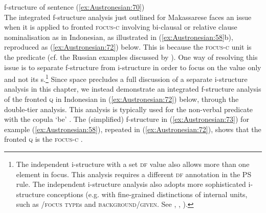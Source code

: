 \documentclass[output=paper,chinesefont]{../langscibook}
\begin{document}
\newpage
\ea\label{ex:Austronesian:71} f-structure of sentence (\ref{ex:Austronesian:70})\\
\z
The integrated f-structure analysis just outlined for Makassarese faces an issue when it is applied to fronted \textsc{focus-c} involving bi-clausal or relative clause nominalisation as in Indonesian, as illustrated in (\ref{ex:Austronesian:58}b), reproduced as (\ref{ex:Austronesian:72}) below. This is because the \textsc{focus-c} unit is the predicate (cf. the Russian examples discussed by \citealt{King1997}). One way of resolving this issue is to separate f-structure from i-structure in order to focus on the \PRED value only and not its {\GF}s.\footnote{The independent i-structure with a set \textsc{df} value also allows more than one element in focus. This analysis requires a different \textsc{df} annotation in the PS rule. The independent i-structure analysis also adopts more sophisticated i-structure conceptions (e.g. with fine-grained distinctions of internal units, such as \TOPIC/\textsc{focus} \textsc{type}s and \textsc{background/given}. See \citealt{King1997}, \citealt{DN}, \citealt{Butt14}).} Since space precludes a full discussion of a separate i-structure analysis in this chapter, we instead demonstrate an integrated f-structure analysis of the fronted \textsc{q} in Indonesian in (\ref{ex:Austronesian:72}) below, through the double-tier \PREDLINK analysis. This analysis is typically used for the non-verbal predicate with the copula `be' \citep{ButtEtAl1999,dalrympleetal04copular}. The (simplified) f-structure in (\ref{ex:Austronesian:73}) for example (\ref{ex:Austronesian:58}), repeated in (\ref{ex:Austronesian:72}), shows that the fronted \textsc{q} is the \textsc{focus-c} \PREDLINK.
\end{document}
